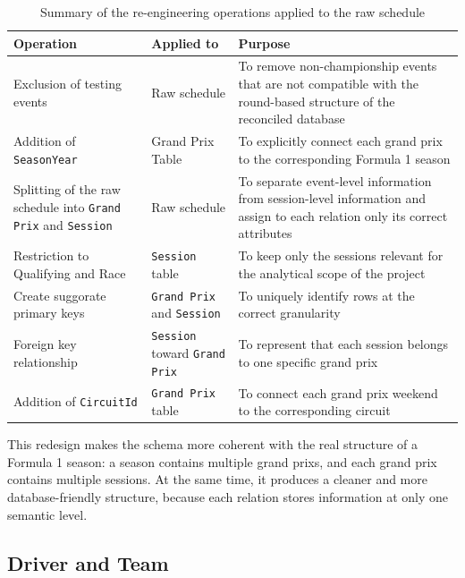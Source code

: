 \documentclass[12pt,a4paper]{article}
\begin{document}
	\begin{table}[H]
		\centering
		\caption{Summary of the re-engineering operations applied to the raw schedule}
		\renewcommand{\arraystretch}{1.2}
		\begin{tabularx}{\textwidth}{>{\raggedright\arraybackslash}p{3.6cm} >{\raggedright\arraybackslash}p{3.2cm} >{\raggedright\arraybackslash}X}
			\toprule
			\textbf{Operation} & \textbf{Applied to} & \textbf{Purpose} \\
			\midrule

			Exclusion of testing events & Raw schedule & To remove non-championship events that are not compatible with the round-based structure of the reconciled database  \\
			\addlinespace
			Addition of \texttt{SeasonYear} & Grand Prix  Table & To explicitly connect each grand prix to the corresponding Formula 1 season \\
			\addlinespace
			Splitting of the raw schedule into \texttt{Grand Prix} and \texttt{Session} & Raw schedule & To separate event-level information from session-level information and assign to each relation only its correct attributes \\
			\addlinespace
			Restriction to Qualifying and Race & \texttt{Session} table & To keep only the sessions relevant for the analytical scope of the project \\
			\addlinespace
			Create suggorate primary keys & \texttt{Grand Prix} and \texttt{Session} & To uniquely identify rows at the correct granularity \\
			\addlinespace
			Foreign key relationship & \texttt{Session} toward \texttt{Grand Prix} & To represent that each session belongs to one specific grand prix \\
			\addlinespace
			Addition of \texttt{CircuitId} & \texttt{Grand Prix} table & To connect each grand prix weekend to the corresponding circuit \\
			\bottomrule
		\end{tabularx}
	\end{table}
	
	This redesign makes the schema more coherent with the real structure of a Formula 1 season:
	a season contains multiple grand prixs, and each grand prix contains multiple sessions.
	At the same time, it produces a cleaner and more database-friendly structure, because each relation stores information at only one semantic level.
	
	
	\subsection{Driver and Team}
	
\end{document}
